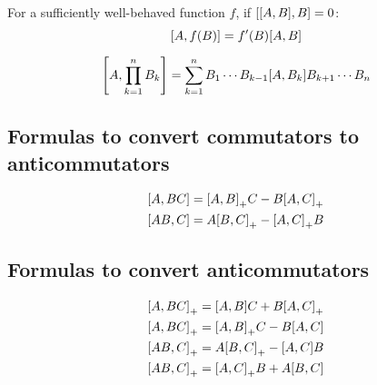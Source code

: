         For a sufficiently well-behaved function $f$, if $\comm{\comm{A}{B}}{B} = 0$:
        \begin{equation}
            \comm{A}{f(B)} = f'(B) \comm{A}{B}
        \end{equation}

        \begin{equation}
            \comm{A}{\prod_{k=1}^n B_k} = \sum_{k=1}^n B_1 \cdots B_{k-1} \comm{A}{B_k} B_{k+1} \cdots B_n
        \end{equation}

    \subsection{Formulas to convert commutators to anticommutators}
        \begin{align}
            & \comm{A}{BC} = \comm{A}{B}_+ C - B \comm{A}{C}_+ \\
            & \comm{AB}{C} = A \comm{B}{C}_+ - \comm{A}{C}_+ B
        \end{align}

    \subsection{Formulas to convert anticommutators}
        \begin{align}
            & \comm{A}{BC}_+ = \comm{A}{B} C + B \comm{A}{C}_+ \\
            & \comm{A}{BC}_+ = \comm{A}{B}_+ C - B \comm{A}{C} \\
            & \comm{AB}{C}_+ = A \comm{B}{C}_+ - \comm{A}{C} B \\
            & \comm{AB}{C}_+ = \comm{A}{C}_+ B + A \comm{B}{C}
        \end{align}
